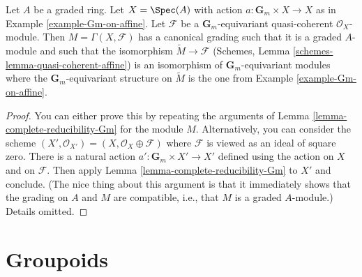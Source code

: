\begin{lemma}
\label{lemma-Gm-equivariant-module}
Let $A$ be a graded ring. Let $X = \Spec(A)$ with action
$a : \mathbf{G}_m \times X \to X$ as in Example \ref{example-Gm-on-affine}.
Let $\mathcal{F}$ be a $\mathbf{G}_m$-equivariant quasi-coherent
$\mathcal{O}_X$-module. Then $M = \Gamma(X, \mathcal{F})$
has a canonical grading such that it is a graded $A$-module
and such that the isomorphism $\widetilde{M} \to \mathcal{F}$
(Schemes, Lemma \ref{schemes-lemma-quasi-coherent-affine})
is an isomorphism of $\mathbf{G}_m$-equivariant modules where
the $\mathbf{G}_m$-equivariant structure on $\widetilde{M}$
is the one from Example \ref{example-Gm-on-affine}.
\end{lemma}

\begin{proof}
You can either prove this by repeating the arguments of
Lemma \ref{lemma-complete-reducibility-Gm} for the module $M$.
Alternatively, you can consider the scheme
$(X', \mathcal{O}_{X'}) = (X, \mathcal{O}_X \oplus \mathcal{F})$
where $\mathcal{F}$ is viewed as an ideal of square zero.
There is a natural action $a' : \mathbf{G}_m \times X' \to X'$
defined using the action on $X$ and on $\mathcal{F}$. Then apply
Lemma \ref{lemma-complete-reducibility-Gm} to $X'$ and conclude.
(The nice thing about this argument is that it immediately shows
that the grading on $A$ and $M$ are compatible, i.e., that $M$
is a graded $A$-module.)
Details omitted.
\end{proof}



\section{Groupoids}
\label{section-groupoids}

